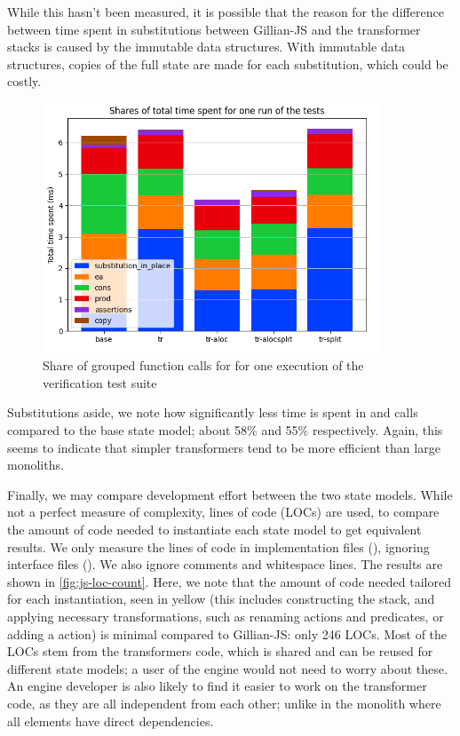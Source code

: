 While this hasn't been measured, it is possible that the reason for the difference between time spent in substitutions between Gillian-JS and the transformer stacks is caused by the immutable data structures. With immutable data structures, copies of the full state are made for each substitution, which could be costly.

\begin{figure}
	\centering
	\includegraphics[width=10cm]{figures/js-timespent-verif.png}
	\caption{Share of grouped function calls for for one execution of the verification test suite}
	\label{fig:js-timespent-verif}
\end{figure}

Substitutions aside, we note how significantly less time is spent in \execac{} and \consume{} calls compared to the base state model; about 58\% and 55\% respectively. Again, this seems to indicate that simpler transformers tend to be more efficient than large monoliths.

Finally, we may compare development effort between the two state models. While not a perfect measure of complexity, lines of code (LOCs) are used, to compare the amount of code needed to instantiate each state model to get equivalent results. We only measure the lines of code in implementation files (), ignoring interface files (). We also ignore comments and whitespace lines. The results are shown in \autoref{fig:js-loc-count}. Here, we note that the amount of code needed tailored for each instantiation, seen in yellow (this includes constructing the stack, and applying necessary transformations, such as renaming actions and predicates, or adding a  action) is minimal compared to Gillian-JS: only 246 LOCs. Most of the LOCs stem from the transformers code, which is shared and can be reused for different state models; a user of the engine would not need to worry about these. An engine developer is also likely to find it easier to work on the transformer code, as they are all independent from each other; unlike in the monolith where all elements have direct dependencies.

